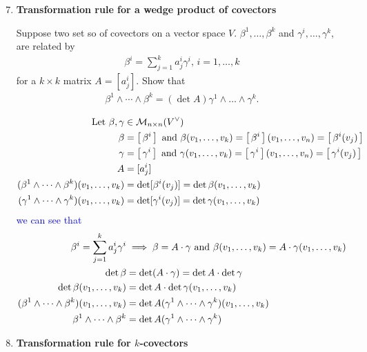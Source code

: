 \documentclass[10pt,a4paper]{report}
\newcommand{\BLUE}[1]{\textcolor{blue}{#1}}
\begin{document}
\begin{enumerate}[label=3.\arabic*.]
	\setcounter{enumi}{6}
	\item \textbf{Transformation rule for a wedge product of covectors}
		
		Suppose two set so of covectors on a vector space $V$.  $\beta^1,\dots, \beta^k$ and $\gamma^i,\dots,\gamma^k$, are related by 
		\begin{align*}
			\beta^i=\sum_{j=1}^k a^i_j\gamma^i, \, i=1,\dots,k
		\end{align*}for a $k \times k$ matrix $A=[a_j^i]$.  Show that
		\begin{align*}
			\beta^1 \wedge\cdots\wedge \beta^k = (\det A)\gamma^1\wedge\dots\wedge\gamma^k.
		\end{align*}
		
	\BLUE{\begin{align*}
		\text{Let } \beta, \gamma &\in \mathcal{M}_{n \times n}(V^\vee) \\
		\beta &= \left [\,  \beta^i  \,\right ] \text{ and } \beta(v_1,\dots,v_k) = \left [\,  \beta^i  \,\right ](v_1,\dots,v_n) = \left [\, \beta^i(v_j) \,\right ]\\
		\gamma &= \left [\,  \gamma^i  \,\right ] \text{ and } \gamma(v_1,\dots,v_k) = \left [\,  \gamma^i  \,\right ](v_1,\dots,v_n) = \left [\, \gamma^i(v_j) \,\right ]\\
		A &= [ a^i_j ] \\
		(\beta^1 \wedge \cdots \wedge \beta^k)(v_1, \dots, v_k) &= \det [ \beta^i(v_j) ] = \det \beta(v_1,\dots,v_k) \\
		(\gamma^1 \wedge \cdots \wedge \gamma^k)(v_1, \dots, v_k) &= \det [ \gamma^i (v_j) ] = \det \gamma(v_1,\dots,v_k)\\
	\end{align*}we can see that 
	\begin{align*}
		\beta^i=\sum_{j=1}^k a^i_j\gamma^i &\implies \beta = A \cdot \gamma \text{ and } \beta(v_1,\dots,v_k) = A \cdot \gamma(v_1,\dots,v_k)\\
		\det\beta &= \det (A \cdot \gamma) = \det A \cdot \det \gamma \\
		\det\beta(v_1,\dots,v_k) &=  \det A \cdot \det \gamma(v_1,\dots,v_k) \\
		(\beta^1 \wedge \cdots \wedge \beta^k)(v_1, \dots, v_k) &=  \det A (\gamma^1 \wedge \cdots \wedge \gamma^k)(v_1, \dots, v_k) \\
		\beta^1 \wedge \cdots \wedge \beta^k &=  \det A (\gamma^1 \wedge \cdots \wedge \gamma^k)
	\end{align*}
	}
	
	\item \textbf{Transformation rule for $k$-covectors}
		

\end{enumerate}
\end{document}
